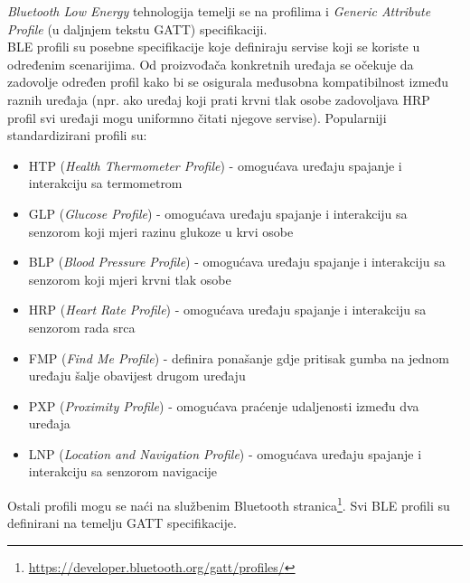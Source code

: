 \textit{Bluetooth Low Energy} tehnologija temelji se na profilima i \textit{Generic Attribute Profile} (u daljnjem tekstu GATT) specifikaciji. 
\\
BLE profili su posebne specifikacije koje definiraju servise koji se koriste u određenim scenarijima. 
Od proizvođača konkretnih uređaja se očekuje da zadovolje određen profil kako bi se osigurala međusobna kompatibilnost između raznih uređaja (npr. ako uređaj koji prati krvni tlak osobe zadovoljava HRP profil svi uređaji mogu uniformno čitati njegove servise). 
Popularniji standardizirani profili su:
\begin{itemize}
    \item HTP (\textit{Health Thermometer Profile}) - omogućava uređaju spajanje i interakciju sa termometrom
    \item GLP (\textit{Glucose Profile}) - omogućava uređaju spajanje i interakciju sa senzorom koji mjeri razinu glukoze u krvi osobe
    \item BLP (\textit{Blood Pressure Profile}) - omogućava uređaju spajanje i interakciju sa senzorom koji mjeri krvni tlak osobe
    \item HRP (\textit{Heart Rate Profile}) - omogućava uređaju spajanje i interakciju sa senzorom rada srca 
    \item FMP (\textit{Find Me Profile}) - definira ponašanje gdje pritisak gumba na jednom uređaju šalje obavijest drugom uređaju
    \item PXP (\textit{Proximity Profile}) - omogućava praćenje udaljenosti između dva uređaja
    \item LNP (\textit{Location and Navigation Profile}) - omogućava uređaju spajanje i interakciju sa senzorom navigacije
\end{itemize}
Ostali profili mogu se naći na službenim Bluetooth stranica\footnote{\url{https://developer.bluetooth.org/gatt/profiles/}}. Svi BLE profili su definirani na temelju GATT specifikacije.
\\


